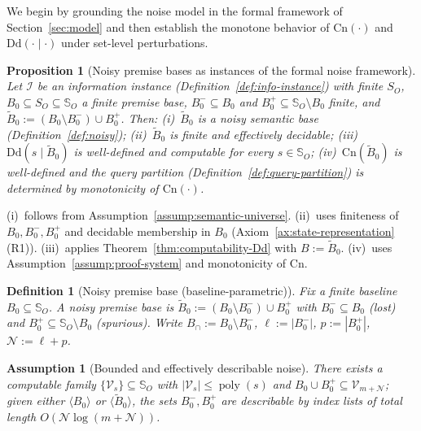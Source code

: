\documentclass[journal]{IEEEtran}
\makeatletter
\newcommand{\Dd}{\text{Dd}}
\newcommand{\Cn}{\text{Cn}}
\newcommand{\poly}{\operatorname{poly}}
\newtheorem{assumption}{Assumption}[section]
\newtheorem{proposition}{Proposition}[section]
\newtheorem{definition}{Definition}[section]
\numberwithin{equation}{section}
\renewenvironment{proof}[1][\proofname]{\par
  \pushQED{\qed}%
  \normalfont \topsep6\p@\@plus6\p@\relax
  \trivlist
  \item[\hskip\labelsep
        \itshape
    #1\@addpunct{.}]\ignorespaces
}{%
  \popQED\endtrivlist\@endpefalse
}
\makeatother
\begin{document}
We begin by grounding the noise model in the formal framework of
Section~\ref{sec:model} and then establish the monotone behavior of
$\Cn(\cdot)$ and $\Dd(\cdot\mid\cdot)$ under set-level
perturbations.

\begin{proposition}[Noisy premise bases as instances of the
  formal noise framework]
\label{prop:noisy-base-grounding}
Let\/ $\mathcal{I}$ be an information instance
\textup{(Definition~\ref{def:info-instance})} with finite
$S_O$, $B_0\subseteq S_O\subseteq\mathbb{S}_O$ a finite
premise base, $B_0^-\subseteq B_0$ and
$B_0^+\subseteq\mathbb{S}_O\setminus B_0$ finite, and
$\tilde B_0:=(B_0\setminus B_0^-)\cup B_0^+$.
Then:
\textup{(i)}~$\tilde B_0$ is a noisy semantic base
\textup{(Definition~\ref{def:noisy})};
\textup{(ii)}~$\tilde B_0$ is finite and effectively decidable;
\textup{(iii)}~$\Dd(s\mid\tilde B_0)$ is well-defined and
computable for every $s\in\mathbb{S}_O$;
\textup{(iv)}~$\Cn(\tilde B_0)$ is well-defined and the query
partition
\textup{(Definition~\ref{def:query-partition})} is determined by
monotonicity of $\Cn(\cdot)$.
\end{proposition}

\begin{proof}
(i)~follows from
Assumption~\ref{assump:semantic-universe}.
(ii)~uses finiteness of $B_0,B_0^-,B_0^+$ and decidable
membership in $B_0$
(Axiom~\ref{ax:state-representation}(R1)).
(iii)~applies Theorem~\ref{thm:computability-Dd} with
$B:=\tilde B_0$.
(iv)~uses Assumption~\ref{assump:proof-system} and monotonicity
of $\Cn$.
\end{proof}

\begin{definition}[Noisy premise base (baseline-parametric)]
\label{def:noisy-base}
Fix a finite baseline $B_0\subseteq\mathbb S_O$.
A \emph{noisy premise base} is
$\tilde B_0:=(B_0\setminus B_0^-)\cup B_0^+$
with $B_0^-\subseteq B_0$ (lost) and
$B_0^+\subseteq\mathbb S_O\setminus B_0$ (spurious).
Write $B_\cap:=B_0\setminus B_0^-$, $\ell:=|B_0^-|$,
$p:=|B_0^+|$, $\mathcal N:=\ell+p$.
\end{definition}

\begin{assumption}[Bounded and effectively describable noise]
\label{assump:bounded-noise}
There exists a computable family $\{\mathcal V_s\}\subseteq
\mathbb S_O$ with $|\mathcal V_s|\le\poly(s)$ and
$B_0\cup B_0^+\subseteq\mathcal V_{m+\mathcal N}$;
given either $\langle B_0\rangle$ or
$\langle\tilde B_0\rangle$, the sets $B_0^-,B_0^+$ are
describable by index lists of total length
$O(\mathcal N\log(m+\mathcal N))$.
\end{assumption}
\end{document}
